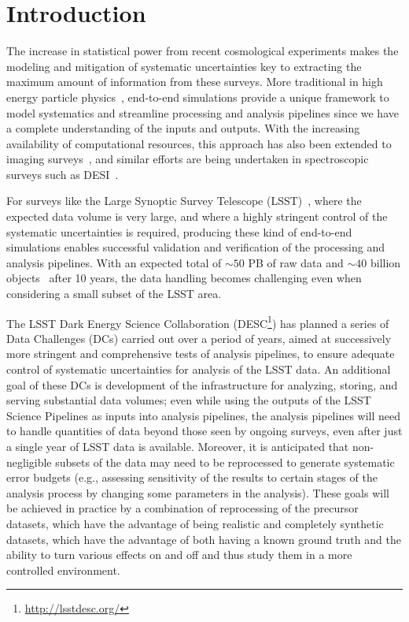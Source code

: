 \documentclass[twocolumn]{aastex62}
\begin{document}

\section{Introduction}
\label{sec:intro}
The increase in statistical power from recent cosmological experiments makes the modeling and mitigation of systematic uncertainties key to extracting the maximum amount of information from these surveys. More traditional in high energy particle physics~\citep{Brun:118715, 2006JHEP...05..026S}, end-to-end simulations provide a unique framework to
model systematics and streamline processing and analysis pipelines since we have a complete understanding of the inputs and outputs. With the increasing availability of computational resources, this approach has also been extended to imaging surveys~\citep{2016ApJ...817...25B}, and similar efforts are being undertaken in spectroscopic surveys such as DESI~\citep{2016arXiv161100036D}.

For surveys like the Large Synoptic Survey Telescope (LSST)~\citep{Overview}, where the expected data volume is very large, and where a highly stringent control of the systematic uncertainties is required, producing these
kind of end-to-end simulations enables successful validation and verification of the processing and
analysis pipelines. With an expected total of $\sim 50$ PB of raw data and $\sim 40$ billion objects~\citep{Overview} after 10 years, the
data handling becomes challenging even when considering a small subset of the LSST area.  

The LSST Dark Energy Science Collaboration
(DESC\footnote{\url{http://lsstdesc.org/}}) has planned a series of
Data Challenges (DCs) carried out over a period of years, aimed at
successively more stringent and comprehensive tests of analysis
pipelines, to ensure adequate control of systematic uncertainties for
analysis of the LSST data.  An additional goal of these DCs is
development of the infrastructure for analyzing, storing, and serving
substantial data volumes; even while using the outputs of the LSST
Science Pipelines as inputs into analysis pipelines, the
analysis pipelines will need to handle quantities of data beyond those
seen by ongoing surveys, even after just a single year of LSST data is
available. Moreover, it is anticipated that non-negligible subsets of
the data may need to be reprocessed to generate systematic error
budgets (e.g., assessing sensitivity of the results to certain stages
of the analysis process by changing some parameters in the
analysis). These goals will be achieved in practice by a combination
of reprocessing of the precursor datasets, which have the advantage of
being realistic and completely synthetic datasets, which have the
advantage of both having a known ground truth and the ability to turn
various effects on and off and thus study them in a more controlled
environment.
\end{document}
